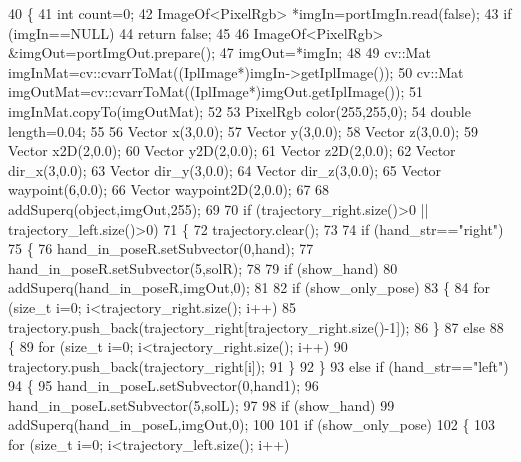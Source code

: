 \begin{DoxyCode}
40 \{
41     \textcolor{keywordtype}{int} count=0;
42     ImageOf<PixelRgb> *imgIn=portImgIn.read(\textcolor{keyword}{false});
43     \textcolor{keywordflow}{if} (imgIn==NULL)
44         \textcolor{keywordflow}{return} \textcolor{keyword}{false};
45 
46     ImageOf<PixelRgb> &imgOut=portImgOut.prepare();
47     imgOut=*imgIn;
48 
49     cv::Mat imgInMat=cv::cvarrToMat((IplImage*)imgIn->getIplImage());
50     cv::Mat imgOutMat=cv::cvarrToMat((IplImage*)imgOut.getIplImage());
51     imgInMat.copyTo(imgOutMat);
52 
53     PixelRgb color(255,255,0);
54     \textcolor{keywordtype}{double} length=0.04;
55 
56     Vector x(3,0.0);
57     Vector y(3,0.0);
58     Vector z(3,0.0);  
59     Vector x2D(2,0.0);
60     Vector y2D(2,0.0);
61     Vector z2D(2,0.0);  
62     Vector dir\_x(3,0.0);
63     Vector dir\_y(3,0.0);
64     Vector dir\_z(3,0.0);
65     Vector waypoint(6,0.0);
66     Vector waypoint2D(2,0.0);
67 
68     addSuperq(\textcolor{keywordtype}{object},imgOut,255);
69 
70     \textcolor{keywordflow}{if} (trajectory_right.size()>0 || trajectory_left.size()>0)
71     \{
72         trajectory.clear();
73 
74         \textcolor{keywordflow}{if} (hand\_str==\textcolor{stringliteral}{"right"})
75         \{
76             hand_in_poseR.setSubvector(0,hand);
77             hand_in_poseR.setSubvector(5,solR);
78 
79             \textcolor{keywordflow}{if} (show_hand)
80                 addSuperq(hand_in_poseR,imgOut,0);
81 
82             \textcolor{keywordflow}{if} (show_only_pose)
83             \{
84                 \textcolor{keywordflow}{for} (\textcolor{keywordtype}{size\_t} i=0; i<trajectory_right.size(); i++)
85                     trajectory.push\_back(trajectory_right[trajectory_right.size()-1]);
86             \}
87             \textcolor{keywordflow}{else}
88             \{
89                 \textcolor{keywordflow}{for} (\textcolor{keywordtype}{size\_t} i=0; i<trajectory_right.size(); i++)
90                     trajectory.push\_back(trajectory_right[i]);
91             \}
92         \}
93         \textcolor{keywordflow}{else} \textcolor{keywordflow}{if} (hand\_str==\textcolor{stringliteral}{"left"})
94         \{
95             hand_in_poseL.setSubvector(0,hand1);
96             hand_in_poseL.setSubvector(5,solL);
97 
98             \textcolor{keywordflow}{if} (show_hand)               
99                 addSuperq(hand_in_poseL,imgOut,0);
100 
101             \textcolor{keywordflow}{if} (show_only_pose)
102             \{
103                 \textcolor{keywordflow}{for} (\textcolor{keywordtype}{size\_t} i=0; i<trajectory_left.size(); i++)

\end{DoxyCode}
